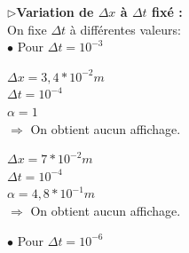$\triangleright$\textbf{Variation de  $\Delta x$ à $\Delta t$ fixé :}\\

On fixe $\Delta t$ à différentes valeurs:\\

\hspace*{1cm}$\bullet$ Pour $\Delta t= {10}^{-3}$ \\

\begin{enumerate}[label=\alph*)]

\begin{minipage}{.6\textwidth}%

\item $\Delta x=3,4*{10}^{-2}m$ \\
$\Delta t= {10}^{-4}$ \\
$\alpha= 1$\\


$\Longrightarrow$ On obtient aucun affichage.

\end{minipage}%
\hfill
\begin{minipage}{.6\textwidth}%

\item $\Delta x=7*{10}^{-2}m$ \\
$\Delta t= {10}^{-4}$ \\
$\alpha= 4,8*{10}^{-1}m$\\


$\Longrightarrow$ On obtient aucun affichage.\\

\end{minipage}%


\end{enumerate}


\hspace*{1cm}$\bullet$ Pour $\Delta t= {10}^{-6}$ \\

